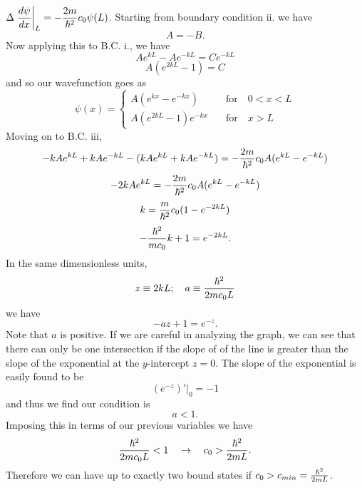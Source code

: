 \documentclass[11pt,letterpaper]{article}
\begin{document}
				\item 
				$\ds\Delta\elr{\diff[\psi]{x}}_L = -\frac{2m}{\h^2}c_0\psi(L)$.
			\eenum
			Starting from boundary condition ii. we have
			\[
				A=-B.
			\]
			Now applying this to B.C. i., we have
			\[
				Ae^{kL}-Ae^{-kL} = Ce^{-kL}
			\]
			\[
				A(e^{2kL}-1)=C
			\]
			and so our wavefunction goes as
			\[
				\psi(x) = \begin{cases} A(e^{kx}-e^{-kx})&\quad\text{for}\quad 0<x<L\\ A(e^{2kL}-1)e^{-kx} &\quad\text{for}\quad x>L 
				\end{cases}
			\]
			Moving on to B.C. iii,
			\[
				-kAe^{kL}+kAe^{-kL} - (kAe^{kL}+kAe^{-kL}) = -\frac{2m}{\h^2}c_0A(e^{kL}-e^{-kL})
			\]
			\[
				-2kAe^{kL} = -\frac{2m}{\h^2}c_0A(e^{kL}-e^{-kL})
			\]
			\[
				k = \frac{m}{\h^2}c_0(1-e^{-2kL})
			\]
			\[
				-\frac{\h^2}{mc_0}k +1 = e^{-2kL}.
			\]
			In the same dimensionless units, 
			\[
				z\equiv 2kL;\quad a \equiv\frac{\h^2}{2mc_0L}
			\]
			we have
			\[
				-az+1 = e^{-z}.
			\]
			Note that $a$ is positive. If we are careful in analyzing the graph, we can see that there can only be one intersection if the slope of 
			of the line is greater than the slope of the exponential at the $y$-intercept $z=0$.  The slope of the exponential is easily found to 
			be 
			\[
				(e^{-z})'|_0 = -1
			\]
			and thus we find our condition is 
			\[
				a<1.
			\]
			Imposing this in terms of our previous variables we have
			\[
				\frac{\h^2}{2mc_0L}<1\quad\to\quad c_0>\frac{\h^2}{2mL}.
			\]
			Therefore we can have up to exactly two bound states if $c_0>c_{min}=\frac{\h^2}{2mL}$. 
		\eenum
	\eenum
	
\phantom{}
\end{document}
